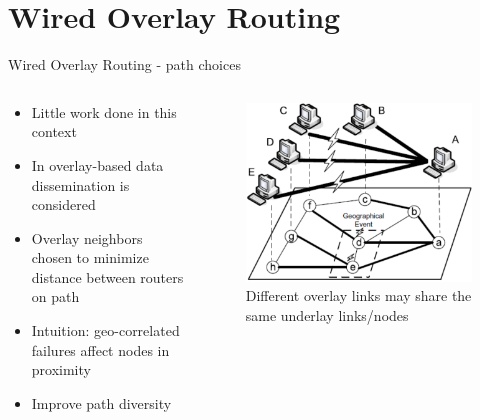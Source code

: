 \documentclass[pdftex]{beamer}
\begin{document}

\section{Wired Overlay Routing}

\begin{frame}{Wired Overlay Routing - path choices}
\begin{columns}
\begin{column}{.5\textwidth}
\begin{itemize}
	\item Little work done in this context
	\item In \cite{Kim2010} overlay-based data dissemination is considered
	\item Overlay neighbors chosen to minimize distance between routers on path
	\item Intuition: geo-correlated failures affect nodes in proximity
	\item Improve path diversity
\end{itemize}
\end{column}

\begin{column}{.5\textwidth}
\begin{figure}
\includegraphics[width=\textwidth]{geo_failures_kyungbaek}
\caption{Different overlay links may share the same underlay links/nodes}
\end{figure}
\end{column}
\end{columns}
\end{frame}
\end{document}
